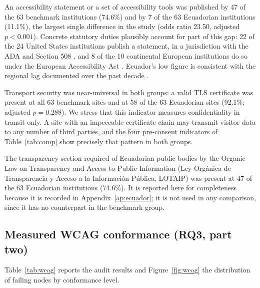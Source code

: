 \documentclass[pdflatex,sn-basic,Numbered,iicol]{sn-jnl}
\theoremstyle{thmstyleone}
\theoremstyle{thmstyletwo}
\theoremstyle{thmstylethree}
\begin{document}
An accessibility statement or a set of accessibility tools was published by 47 of the 63 benchmark institutions (74.6\%) and by 7 of the 63 Ecuadorian institutions (11.1\%), the largest single difference in the study (odds ratio 23.50, adjusted $p<0.001$). Concrete statutory duties plausibly account for part of this gap: 22 of the 24 United States institutions publish a statement, in a jurisdiction with the ADA and Section 508 \citep{ada1990,section508}, and 8 of the 10 continental European institutions do so under the European Accessibility Act \citep{eaa2019}. Ecuador's low figure is consistent with the regional lag documented over the past decade \citep{campoverdemolina2023accessibility,acostavargas2020dataset}.

Transport security was near-universal in both groups: a valid TLS certificate was present at all 63 benchmark sites and at 58 of the 63 Ecuadorian sites (92.1\%; adjusted $p=0.288$). We stress that this indicator measures confidentiality in transit only. A site with an impeccable certificate chain may transmit visitor data to any number of third parties, and the four pre-consent indicators of Table~\ref{tab:comp} show precisely that pattern in both groups.

The transparency section required of Ecuadorian public bodies by the Organic Law on Transparency and Access to Public Information (Ley Org\'anica de Transparencia y Acceso a la Informaci\'on P\'ublica, LOTAIP) was present at 47 of the 63 Ecuadorian institutions (74.6\%). It is reported here for completeness because it is recorded in Appendix~\ref{ap:ecuador}; it is not used in any comparison, since it has no counterpart in the benchmark group.

\subsection{Measured WCAG conformance (RQ3, part two)}\label{sec:results-wcag}

Table~\ref{tab:wcag} reports the audit results and Figure~\ref{fig:wcag} the distribution of failing nodes by conformance level.
\end{document}
